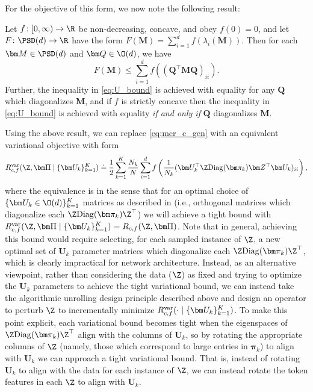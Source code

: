 \documentclass[../../book-main.tex]{subfiles}
\begin{document}
For the objective of this form, we now note the following result:
\begin{theorem}
\label{thm:var_concave}
    Let \(f \colon [0, \infty) \to \R\) be non-decreasing, concave, and obey \(f(0) = 0\), and let \(F \colon \PSD(d) \to \R\) have the form \(F(\bm M) = \sum_{i = 1}^{d}f(\lambda_{i}(\bm M))\). Then for each \(\bm M \in \PSD(d)\) and \(\bm Q \in \O(d)\), we have
    \begin{equation}
        \label{eq:U_bound}
        F(\bm M) \leq  \sum_{i=1}^{d} f\left( (\bm Q^{\top} \bm M \bm Q)_{ii} \right).
    \end{equation}
    Further, the inequality in \eqref{eq:U_bound} is achieved with equality for any $\bm Q$ which diagonalizes $\bm M$, and if $f$ is strictly concave then the inequality in \eqref{eq:U_bound} is achieved with equality \textit{if and only if} $\bm Q$ diagonalizes $\bm M$. 
\end{theorem}

Using the above result, we can replace \eqref{eq:mcr_c_gen} with an equivalent variational objective with form
\vspace{-2mm}
\begin{equation}
    \label{eq:var_comp}
    R^{\rm var}_{c,f} (\Z,\bm \Pi \mid \{\bm U_{k}\}_{k = 1}^{K}) \doteq \frac{1}{2}\sum_{k=1}^K \frac{N_k}{N} \sum_{i=1}^{d} f\left(\frac{1}{N_k} (\bm U_{k}^{\top} \Z \mathrm{Diag}(\bm \pi_k) \bm Z^{\top} \bm U_{k})_{ii} \right),
\end{equation}
where the equivalence is in the sense that for an optimal choice of $\{ \bm U_k \in \O(d)\}_{k=1}^K$ matrices as described in  (i.e., orthogonal matrices which diagonalize each $\Z \mathrm{Diag}(\bm \pi_k) \Z^\top $) we will achieve a tight bound with $ R^{\rm var}_{c,f} (\Z,\bm \Pi \mid \{\bm U_{k}\}_{k = 1}^{K}) = R_{c,f} (\Z,\bm \Pi)$. Note that in general, achieving this bound would require selecting, for each sampled instance of $\Z$, a new optimal set of $\bm U_{k}$ parameter matrices which diagonalize each $\Z\mathrm{Diag}(\bm \pi_{k})\Z^{\top}$, which is clearly impractical for network architecture. 
Instead, as an alternative viewpoint, rather than considering the data ($\Z$) as fixed and trying to optimize the $\bm U_k$ parameters to achieve the tight variational bound, we can instead take the algorithmic unrolling design principle described above and design an operator to perturb $\Z$ to incrementally minimize $R_{c, f}^{\rm var}(\cdot \mid \{\bm U_{k}\}_{k = 1}^{K})$.  To make this point explicit, each variational bound becomes tight when the eigenspaces of $\Z \mathrm{Diag}(\bm \pi_k) \Z
^\top$ align with the columns of $\bm U_k$, so by rotating the appropriate columns of $\Z$ (namely, those which correspond to large entries in $\bm \pi_k$) to align with $\bm U_k$ we can approach a tight variational bound. That is, instead of rotating $\bm U_k$ to align with the data for each instance of $\Z$, we can instead rotate the token features in each $\Z$ to align with $\bm U_k$. 
\end{document}
